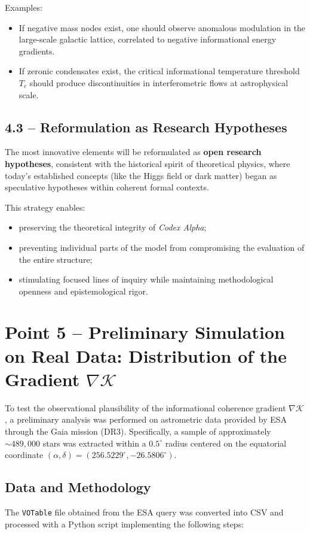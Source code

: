 \documentclass[12pt]{article}
\begin{document}
Examples:
\begin{itemize}
  \item If negative mass nodes exist, one should observe anomalous modulation in the large-scale galactic lattice, correlated to negative informational energy gradients.
  \item If zeronic condensates exist, the critical informational temperature threshold $T_c$ should produce discontinuities in interferometric flows at astrophysical scale.
\end{itemize}

\subsection*{4.3 – Reformulation as Research Hypotheses}

The most innovative elements will be reformulated as \textbf{open research hypotheses}, consistent with the historical spirit of theoretical physics, where today’s established concepts (like the Higgs field or dark matter) began as speculative hypotheses within coherent formal contexts.

This strategy enables:
\begin{itemize}
  \item preserving the theoretical integrity of \textit{Codex Alpha};
  \item preventing individual parts of the model from compromising the evaluation of the entire structure;
  \item stimulating focused lines of inquiry while maintaining methodological openness and epistemological rigor.
\end{itemize}

\section*{Point 5 – Preliminary Simulation on Real Data: Distribution of the Gradient $\nabla \mathcal{K}$}

To test the observational plausibility of the informational coherence gradient $\nabla \mathcal{K}$, a preliminary analysis was performed on astrometric data provided by ESA through the Gaia mission (DR3). Specifically, a sample of approximately $\sim 489{,}000$ stars was extracted within a $0.5^\circ$ radius centered on the equatorial coordinate $(\alpha, \delta) = (256.5229^\circ, -26.5806^\circ)$.

\subsection*{Data and Methodology}
The \texttt{VOTable} file obtained from the ESA query was converted into CSV and processed with a Python script implementing the following steps:
\end{document}
